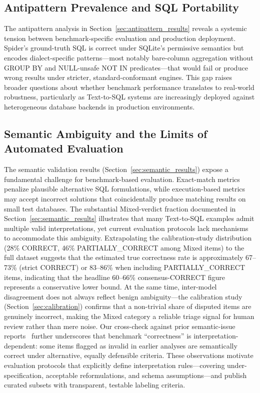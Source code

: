 \documentclass[print]{einformatica}
\begin{document}
\subsection{Antipattern Prevalence and SQL Portability}

The antipattern analysis in Section~\ref{sec:antipattern_results} reveals a systemic tension between benchmark-specific evaluation and production deployment. Spider's ground-truth SQL is correct under SQLite's permissive semantics but encodes dialect-specific patterns---most notably bare-column aggregation without GROUP BY and NULL-unsafe NOT IN predicates---that would fail or produce wrong results under stricter, standard-conformant engines. This gap raises broader questions about whether benchmark performance translates to real-world robustness, particularly as Text-to-SQL systems are increasingly deployed against heterogeneous database backends in production environments.

\subsection{Semantic Ambiguity and the Limits of Automated Evaluation}

The semantic validation results (Section~\ref{sec:semantic_results}) expose a fundamental challenge for benchmark-based evaluation. Exact-match metrics penalize plausible alternative SQL formulations, while execution-based metrics may accept incorrect solutions that coincidentally produce matching results on small test databases. The substantial Mixed-verdict fraction documented in Section~\ref{sec:semantic_results} illustrates that many Text-to-SQL examples admit multiple valid interpretations, yet current evaluation protocols lack mechanisms to accommodate this ambiguity. Extrapolating the calibration-study distribution (28\% CORRECT, 46\% PARTIALLY\_CORRECT among Mixed items) to the full dataset suggests that the estimated true correctness rate is approximately 67--73\% (strict CORRECT) or 83--86\% when including PARTIALLY\_CORRECT items, indicating that the headline 60--66\% consensus-CORRECT figure represents a conservative lower bound. At the same time, inter-model disagreement does not always reflect benign ambiguity---the calibration study (Section~\ref{sec:calibration}) confirms that a non-trivial share of disputed items are genuinely incorrect, making the Mixed category a reliable triage signal for human review rather than mere noise. Our cross-check against prior semantic-issue reports~\cite{liu2025nl2sqlbugs} further underscores that benchmark ``correctness'' is interpretation-dependent: some items flagged as invalid in earlier analyses are semantically correct under alternative, equally defensible criteria. These observations motivate evaluation protocols that explicitly define interpretation rules---covering under-specification, acceptable reformulations, and schema assumptions---and publish curated subsets with transparent, testable labeling criteria.
\end{document}
